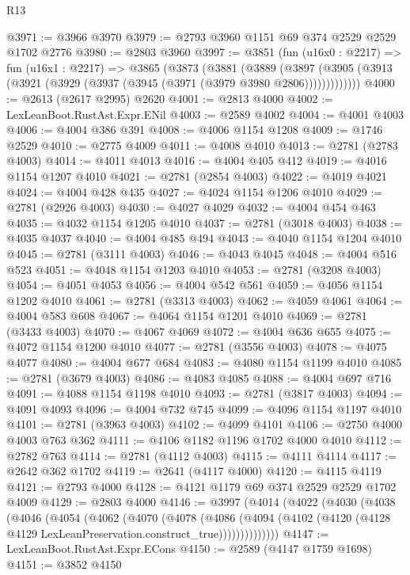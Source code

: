 \begin{lexlean}{R13}
\begin{coremodule}
@3971 := @3966 @3970
@3979 := @2793 @3960 @1151 @69 @374 @2529 @2529 @1702 @2776
@3980 := @2803 @3960
@3997 := @3851
    (fun (u16x0 : @2217) =>
    fun (u16x1 : @2217) =>
    @3865
      (@3873
        (@3881
          (@3889
            (@3897 (@3905 (@3913 (@3921 (@3929 (@3937 (@3945 (@3971 (@3979 @3980 @2806)))))))))))))
@4000 := @2613 (@2617 @2995) @2620
@4001 := @2813 @4000
@4002 := LexLeanBoot.RustAst.Expr.ENil
@4003 := @2589 @4002
@4004 := @4001 @4003
@4006 := @4004 @386 @391
@4008 := @4006 @1154 @1208
@4009 := @1746 @2529
@4010 := @2775 @4009
@4011 := @4008 @4010
@4013 := @2781 (@2783 @4003)
@4014 := @4011 @4013
@4016 := @4004 @405 @412
@4019 := @4016 @1154 @1207 @4010
@4021 := @2781 (@2854 @4003)
@4022 := @4019 @4021
@4024 := @4004 @428 @435
@4027 := @4024 @1154 @1206 @4010
@4029 := @2781 (@2926 @4003)
@4030 := @4027 @4029
@4032 := @4004 @454 @463
@4035 := @4032 @1154 @1205 @4010
@4037 := @2781 (@3018 @4003)
@4038 := @4035 @4037
@4040 := @4004 @485 @494
@4043 := @4040 @1154 @1204 @4010
@4045 := @2781 (@3111 @4003)
@4046 := @4043 @4045
@4048 := @4004 @516 @523
@4051 := @4048 @1154 @1203 @4010
@4053 := @2781 (@3208 @4003)
@4054 := @4051 @4053
@4056 := @4004 @542 @561
@4059 := @4056 @1154 @1202 @4010
@4061 := @2781 (@3313 @4003)
@4062 := @4059 @4061
@4064 := @4004 @583 @608
@4067 := @4064 @1154 @1201 @4010
@4069 := @2781 (@3433 @4003)
@4070 := @4067 @4069
@4072 := @4004 @636 @655
@4075 := @4072 @1154 @1200 @4010
@4077 := @2781 (@3556 @4003)
@4078 := @4075 @4077
@4080 := @4004 @677 @684
@4083 := @4080 @1154 @1199 @4010
@4085 := @2781 (@3679 @4003)
@4086 := @4083 @4085
@4088 := @4004 @697 @716
@4091 := @4088 @1154 @1198 @4010
@4093 := @2781 (@3817 @4003)
@4094 := @4091 @4093
@4096 := @4004 @732 @745
@4099 := @4096 @1154 @1197 @4010
@4101 := @2781 (@3963 @4003)
@4102 := @4099 @4101
@4106 := @2750 @4000 @4003 @763 @362
@4111 := @4106 @1182 @1196 @1702 @4000 @4010
@4112 := @2782 @763
@4114 := @2781 (@4112 @4003)
@4115 := @4111 @4114
@4117 := @2642 @362 @1702
@4119 := @2641 (@4117 @4000)
@4120 := @4115 @4119
@4121 := @2793 @4000
@4128 := @4121 @1179 @69 @374 @2529 @2529 @1702 @4009
@4129 := @2803 @4000
@4146 := @3997
    (@4014
      (@4022
        (@4030
          (@4038
            (@4046
              (@4054
                (@4062
                  (@4070
                    (@4078
                      (@4086
                        (@4094
                          (@4102
                            (@4120 (@4128 @4129 LexLeanPreservation.construct_true))))))))))))))
@4147 := LexLeanBoot.RustAst.Expr.ECons
@4150 := @2589 (@4147 @1759 @1698)
@4151 := @3852 @4150

\end{coremodule}
\end{lexlean}
